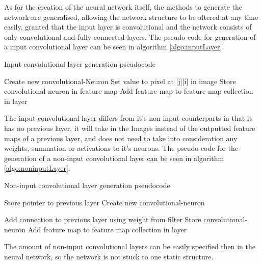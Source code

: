 \documentclass[10pt]{article}
\begin{document}
	As for the creation of the neural network itself, the methods to generate the network are generalised, allowing the network structure to be altered at any time easily, granted that the input layer is convolutional and the network consists of only convolutional and fully connected layers. The pseudo code for generation of a input convolutional layer can be seen in algorithm \ref{algo:inputLayer}.\\
		
		\begin{algorithm}[h]
			\caption{Input convolutional layer generation pseudocode}
			\label{algo:inputLayer}
			\begin{algorithmic}[1]
							\State Create new convolutional-Neuron
							\State Set value to pixel at [j][i] in image
							\State Store convolutional-neuron in feature map
						\EndFor
					\EndFor
					\State Add feature map to feature map collection in layer
				\EndFor
				\EndProcedure
			\end{algorithmic}
		\end{algorithm}
		
		The input convolutional layer differs from it's non-input counterparts in that it has no previous layer, it will take in the Images instead of the outputted feature maps of a previous layer, and does not need to take into consideration any weights, summation or activations to it's neurons. The pseudo-code for the generation of a non-input convolutional layer can be seen in algorithm \ref{algo:noninputLayer}.\\
		
		\begin{algorithm}[h]
			\caption{Non-input convolutional layer generation pseudocode}
			\label{algo:noninputLayer}
			\begin{algorithmic}[1]
				\State Store pointer to previous layer
								\State Create new convolutional-neuron
								
										\State Add connection to previous layer using weight from filter										
									\EndFor									
								\EndFor
								\State Store convolutional-neuron
							\EndFor							
						\EndFor
						\State Add feature map to feature map collection in layer
					\EndFor					
				\EndFor
				
				\EndProcedure
			\end{algorithmic}
		\end{algorithm}
		The amount of non-input convolutional layers can be easily specified then in the neural network, so the network is not stuck to one static structure.\\		
		
\end{document}
